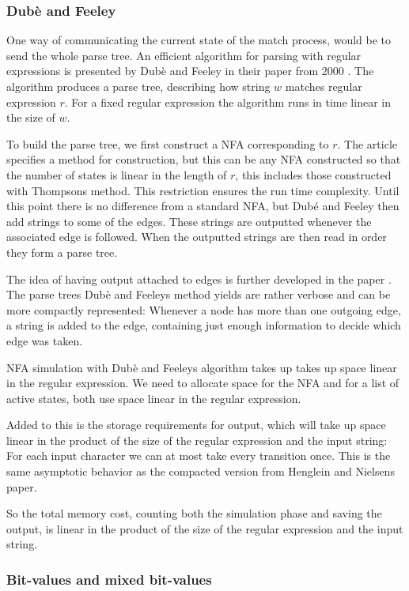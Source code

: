 \subsubsection{Dubè and Feeley}
One way of communicating the current state of the match process, would
be to send the whole parse tree. An efficient algorithm for parsing
with regular expressions is presented by Dubè and Feeley in their
paper from 2000 \cite{Dube2000}. The algorithm produces a parse tree,
describing how string $w$ matches regular expression $r$. For a fixed
regular expression the algorithm runs in time linear in the size of
$w$.

To build the parse tree, we first construct a NFA corresponding to
$r$. The article specifies a method for construction, but this can be
any NFA constructed so that the number of states is linear in the
length of $r$, this includes those constructed with Thompsons
method\cite{Thompson1968}. This restriction ensures the run time
complexity. Until this point there is no difference from a standard
NFA, but Dubé and Feeley then add strings to some of the edges. These
strings are outputted whenever the associated edge is followed. When
the outputted strings are then read in order they form a parse tree.

The idea of having output attached to edges is further developed in
the paper \cite{Henglein2010}. The parse trees Dubè and Feeleys method
yields are rather verbose and can be more compactly represented:
Whenever a node has more than one outgoing edge, a string is added to
the edge, containing just enough information to decide which edge was
taken.

NFA simulation with Dubè and Feeleys algorithm takes up takes up space
linear in the regular expression. We need to allocate space for the
NFA and for a list of active states, both use space linear in the
regular expression.

Added to this is the storage requirements for output, which will take
up space linear in the product of the size of the regular expression
and the input string: For each input character we can at most take
every transition once. This is the same asymptotic behavior as the
compacted version from Henglein and Nielsens paper.

So the total memory cost, counting both the simulation phase and
saving the output, is linear in the product of the size of the regular
expression and the input string.


\subsubsection{Bit-values and mixed bit-values}

